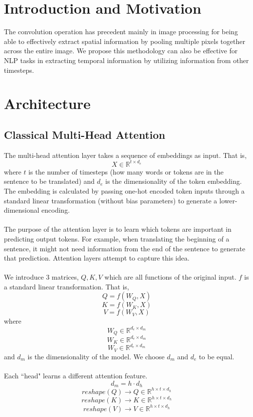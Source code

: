 \documentclass{article}
\begin{document}
	\section{Introduction and Motivation}
	The convolution operation has precedent mainly in image processing for being able to effectively extract spatial information by pooling multiple pixels together across the entire image.  We propose this methodology can also be effective for NLP tasks in extracting temporal information by utilizing information from other timesteps.
	
	\section{Architecture}
	
	\subsection{Classical Multi-Head Attention}
	The multi-head attention layer takes a sequence of embeddings as input.  That is,
	\[X \in \mathbb{R}^{t \times d_e}\]
	where \(t\) is the number of timesteps (how many words or tokens are in the sentence to be translated) and \(d_e\) is the dimensionality of the token embedding.  The embedding is calculated by passing one-hot encoded token inputs through a standard linear transformation (without bias parameters) to generate a lower-dimensional encoding.
	\\~\\
	The purpose of the attention layer is to learn which tokens are important in predicting output tokens.  For example, when translating the beginning of a sentence, it might not need information from the end of the sentence to generate that prediction.  Attention layers attempt to capture this idea.
	\\~\\
	We introduce 3 matrices, \(Q, K, V\) which are all functions of the original input.  \(f\) is a standard linear transformation.  That is,
	\[Q = f(W_Q, X)\]
	\[K = f(W_K, X)\]
	\[V = f(W_V, X)\]
	where
	\[W_Q \in \mathbb{R}^{d_e \times d_m}\]
	\[W_K \in \mathbb{R}^{d_e \times d_m}\]
	\[W_V \in \mathbb{R}^{d_e \times d_m}\]
	and \(d_m\) is the dimensionality of the model.  We choose \(d_m\) and \(d_e\) to be equal.
	\\~\\
	Each ``head" learns a different attention feature.
	\[d_m = h \cdot d_h\]
	\[reshape(Q) \rightarrow Q \in \mathbb{R}^{h \times t \times d_h}\]
	\[reshape(K) \rightarrow K \in \mathbb{R}^{h \times t \times d_h}\]
	\[reshape(V) \rightarrow V \in \mathbb{R}^{h \times t \times d_h}\]
	
\end{document}
